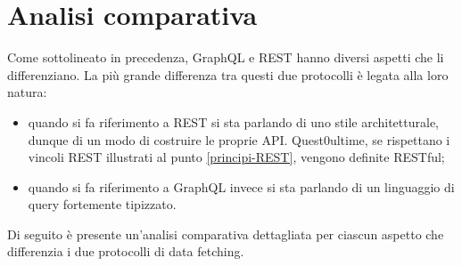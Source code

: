 \section{Analisi comparativa}
Come sottolineato in precedenza, GraphQL e REST hanno diversi aspetti che li differenziano. La più grande differenza tra questi due protocolli è legata alla loro natura:
\begin{itemize}
  \item quando si fa riferimento a REST si sta parlando di uno stile architetturale, dunque di un modo di costruire le proprie API. Quest0ultime, se rispettano i vincoli REST illustrati al punto \ref{principi-REST}, vengono definite RESTful;
  \item quando si fa riferimento a GraphQL invece si sta parlando di un linguaggio di query fortemente tipizzato.
\end{itemize}
Di seguito è presente un'analisi comparativa dettagliata per ciascun aspetto che differenzia i due protocolli di data fetching.
